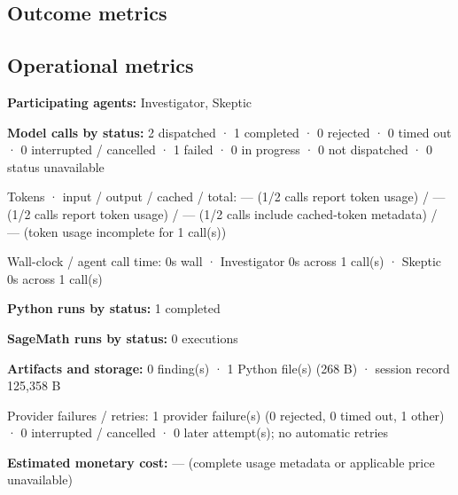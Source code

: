 \documentclass[11pt]{article}
\begin{document}
\subsection{Outcome metrics}
\subsection{Operational metrics}
\textbf{Participating agents:} Investigator, Skeptic\par
\textbf{Model calls by status:} 2 dispatched · 1 completed · 0 rejected · 0 timed out · 0 interrupted / cancelled · 1 failed · 0 in progress · 0 not dispatched · 0 status unavailable\par
Tokens · input / output / cached / total: — (1/2 calls report token usage) / — (1/2 calls report token usage) / — (1/2 calls include cached-token metadata) / — (token usage incomplete for 1 call(s))\par
Wall-clock / agent call time: 0s wall · Investigator 0s across 1 call(s) · Skeptic 0s across 1 call(s)\par
\textbf{Python runs by status:} 1 completed\par
\textbf{SageMath runs by status:} 0 executions\par
\textbf{Artifacts and storage:} 0 finding(s) · 1 Python file(s) (268 B) · session record 125,358 B\par
Provider failures / retries: 1 provider failure(s) (0 rejected, 0 timed out, 1 other) · 0 interrupted / cancelled · 0 later attempt(s); no automatic retries\par
\textbf{Estimated monetary cost:} — (complete usage metadata or applicable price unavailable)\par
\end{document}
